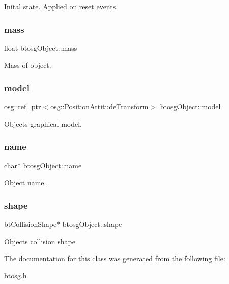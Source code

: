 Inital state. Applied on reset events. 

\mbox{\label{classbtosgObject_a2418bb2194d5e9b0f1c51c84672ba7d1}} 
\subsubsection{\texorpdfstring{mass}{mass}}
{\footnotesize\ttfamily float btosg\+Object\+::mass\hspace{0.3cm}{\ttfamily [inherited]}}



Mass of object. 

\mbox{\label{classbtosgObject_afd15726e7a214212d6d5815f8ac1ac6c}} 
\subsubsection{\texorpdfstring{model}{model}}
{\footnotesize\ttfamily osg\+::ref\+\_\+ptr$<$osg\+::\+Position\+Attitude\+Transform$>$ btosg\+Object\+::model\hspace{0.3cm}{\ttfamily [inherited]}}



Object\textquotesingle{}s graphical model. 

\mbox{\label{classbtosgObject_a12396e1362797a75473a2e833b579cc9}} 
\subsubsection{\texorpdfstring{name}{name}}
{\footnotesize\ttfamily char$\ast$ btosg\+Object\+::name\hspace{0.3cm}{\ttfamily [inherited]}}



Object name. 

\mbox{\label{classbtosgObject_a0f6a8da01cf643c321bffe86e42604b0}} 
\subsubsection{\texorpdfstring{shape}{shape}}
{\footnotesize\ttfamily bt\+Collision\+Shape$\ast$ btosg\+Object\+::shape\hspace{0.3cm}{\ttfamily [inherited]}}



Object\textquotesingle{}s collision shape. 



The documentation for this class was generated from the following file\+:\begin{DoxyCompactItemize}
\item 
btosg.\+h\end{DoxyCompactItemize}
